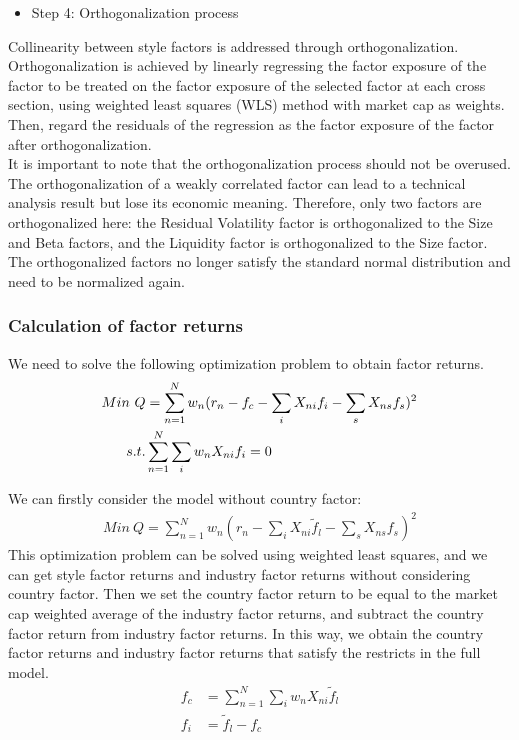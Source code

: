 \documentclass[10pt]{article}
\begin{document}
\begin{itemize}
    \item Step 4: Orthogonalization process
\end{itemize}

Collinearity between style factors is addressed through orthogonalization. \\
Orthogonalization is achieved by linearly regressing the factor exposure of the factor to be treated on the factor exposure of the selected factor at each cross section, using weighted least squares (WLS) method with market cap as weights. Then, regard the residuals of the regression as the factor exposure of the factor after orthogonalization.\\
It is important to note that the orthogonalization process should not be overused. The orthogonalization of a weakly correlated factor can lead to a technical analysis result but lose its economic meaning. Therefore, only two factors are orthogonalized here: the Residual Volatility factor is orthogonalized to the Size and Beta factors, and the Liquidity factor is orthogonalized to the Size factor. The orthogonalized factors no longer satisfy the standard normal distribution and need to be normalized again.

\subsubsection{Calculation of factor returns}
We need to solve the following optimization problem to obtain factor returns.
\begin{align}
 Min\ Q & =\sum^N_{n=1} w_n(r_n-f_c-\sum_i X_{ni}f_i-\sum_s X_{ns}f_s)^2 \\
s.t. & \sum^N_{n=1} \sum_i w_n X_{ni} f_i=0 \notag
\end{align}

We can firstly consider the model without country factor:
\begin{align}
 Min\ Q =\sum^N_{n=1} w_n(r_n-\sum_i X_{ni} \widetilde f_l-\sum_s X_{ns}f_s)^2 
\end{align}
This optimization problem can be solved using weighted least squares, and we can get style factor returns and industry factor returns without considering country factor. Then we set the country factor return to be equal to the market cap weighted average of the industry factor returns, and subtract the country factor return from industry factor returns. In this way, we obtain the country factor returns and industry factor returns that satisfy the restricts in the full model.
\begin{align*}
f_c &=\sum^N_{n=1} \sum_i w_n X_{ni} \widetilde f_l\\
f_i &=\widetilde f_l - f_c
\end{align*}
\end{document}
